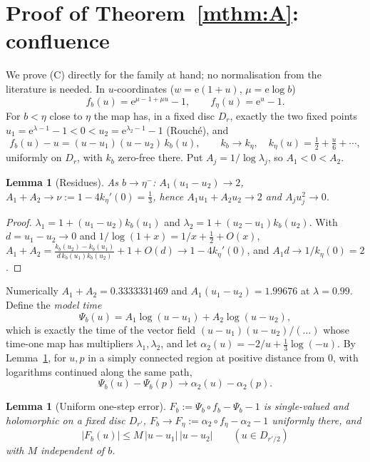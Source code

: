 \documentclass[11pt]{amsart}
\newtheorem{lemma}[theorem]{Lemma}
\theoremstyle{definition}
\newcommand{\eee}{\mathrm{e}}
\begin{document}
\section{Proof of Theorem~\ref{mthm:A}: confluence}\label{sec:proofC}

We prove (C) directly for the family at hand; no normalisation from the
literature is needed.  In $u$-coordinates ($w=\eee(1+u)$, $\mu=\eee\log b$)
\[
 f_b(u)=\eee^{\mu-1+\mu u}-1,\qquad f_\eta(u)=\eee^u-1 .
\]
For $b<\eta$ close to $\eta$ the map has, in a fixed disc $D_r$, exactly the two
fixed points $u_1=\eee^{\lambda-1}-1<0<u_2=\eee^{\lambda_2-1}-1$ (Rouch\'e), and
\begin{equation}\label{eq:prepared}
 f_b(u)-u=(u-u_1)(u-u_2)\,k_b(u),\qquad k_b\to k_\eta,\quad
 k_\eta(u)=\tfrac12+\tfrac u6+\cdots,
\end{equation}
uniformly on $D_r$, with $k_b$ zero-free there.  Put $A_j=1/\log\lambda_j$,
so $A_1<0<A_2$.

\begin{lemma}[Residues]\label{lem:res}
As $b\to\eta^-$: $A_1(u_1-u_2)\to2$, $A_1+A_2\to\nu:=1-4k_\eta'(0)=\tfrac13$, hence
$A_1u_1+A_2u_2\to2$ and $A_ju_j^2\to0$.
\end{lemma}

\begin{proof}
$\lambda_1=1+(u_1-u_2)k_b(u_1)$ and $\lambda_2=1+(u_2-u_1)k_b(u_2)$.  With
$d=u_1-u_2\to0$ and $1/\log(1+x)=1/x+\tfrac12+O(x)$,
$A_1+A_2=\frac{k_b(u_2)-k_b(u_1)}{d\,k_b(u_1)k_b(u_2)}+1+O(d)\to1-4k_\eta'(0)$,
and $A_1d\to1/k_\eta(0)=2$.
\end{proof}

\noindent
Numerically $A_1+A_2=0.3333331469$ and $A_1(u_1-u_2)=1.99676$ at $\lambda=0.99$.
Define the \emph{model time}
\[
 \Psi_b(u)=A_1\log(u-u_1)+A_2\log(u-u_2),
\]
which is exactly the time of the vector field $(u-u_1)(u-u_2)/(\ldots)$ whose
time-one map has multipliers $\lambda_1,\lambda_2$, and let
$\alpha_2(u)=-2/u+\tfrac13\log(-u)$.  By Lemma~\ref{lem:res}, for $u,p$ in a
simply connected region at positive distance from $0$, with logarithms
continued along the same path,
\begin{equation}\label{eq:psilimit}
 \Psi_b(u)-\Psi_b(p)\longrightarrow\alpha_2(u)-\alpha_2(p).
\end{equation}

\begin{lemma}[Uniform one-step error]\label{lem:F}
$F_b:=\Psi_b\circ f_b-\Psi_b-1$ is single-valued and holomorphic on a fixed disc
$D_{r'}$, $F_b\to F_\eta:=\alpha_2\circ f_\eta-\alpha_2-1$ uniformly there, and
\[
 |F_b(u)|\le M\,|u-u_1|\,|u-u_2|\qquad(u\in D_{r'/2})
\]
with $M$ independent of $b$.
\end{lemma}
\end{document}

